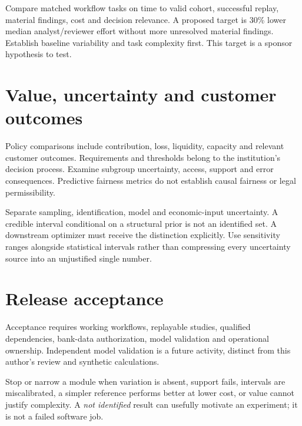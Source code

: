 Compare matched workflow tasks on time to valid cohort, successful replay,
material findings, cost and decision relevance. A proposed target is 30\%
lower median analyst/reviewer effort without more unresolved material
findings. Establish baseline variability and task complexity first.
This target is a sponsor hypothesis to test.

\section{Value, uncertainty and customer outcomes}
Policy comparisons include contribution, loss, liquidity, capacity and
relevant customer outcomes. Requirements and thresholds belong to the
institution's decision process. Examine subgroup uncertainty, access,
support and error consequences. Predictive fairness metrics do not
establish causal fairness or legal permissibility.

Separate sampling, identification, model and economic-input uncertainty.
A credible interval conditional on a structural prior is not an identified
set. A downstream optimizer must receive the distinction explicitly.
Use sensitivity ranges alongside statistical intervals rather than
compressing every uncertainty source into an unjustified single number.

\section{Release acceptance}
Acceptance requires working workflows, replayable studies, qualified
dependencies, bank-data authorization, model validation and operational
ownership. Independent model validation is a future activity, distinct
from this author's review and synthetic calculations.

Stop or narrow a module when variation is absent, support fails, intervals
are miscalibrated, a simpler reference performs better at lower cost, or
value cannot justify complexity. A \emph{not identified} result can usefully
motivate an experiment; it is not a failed software job.
